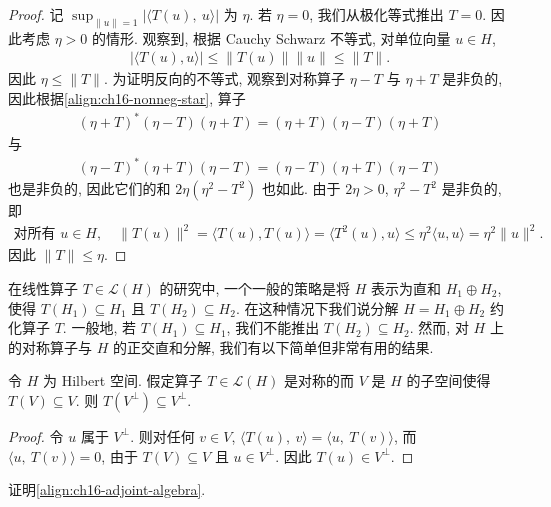 \documentclass[../../main.tex]{subfiles}
\begin{document}
\begin{proof}
记 $\sup_{\|u\|=1}|\langle T(u),\ u\rangle|$ 为 $\eta$. 若 $\eta=0$, 我们从极化等式推出 $T=0$. 因此考虑 $\eta>0$ 的情形. 观察到, 根据 Cauchy Schwarz 不等式, 对单位向量 $u\in H$,
\begin{align*}
|\langle T(u),u\rangle|\leqslant\|T(u)\|\|u\|\leqslant\|T\|.
\end{align*}
因此 $\eta\leqslant\|T\|$. 为证明反向的不等式, 观察到对称算子 $\eta-T$ 与 $\eta+T$ 是非负的, 因此根据\eqref{align:ch16-nonneg-star}, 算子
\begin{align*}
(\eta+T)^{*}(\eta-T)(\eta+T)=(\eta+T)(\eta-T)(\eta+T)
\end{align*}
与
\begin{align*}
(\eta-T)^{*}(\eta+T)(\eta-T)=(\eta-T)(\eta+T)(\eta-T)
\end{align*}
也是非负的, 因此它们的和 $2\eta(\eta^{2}-T^{2})$ 也如此. 由于 $2\eta>0$, $\eta^{2}-T^{2}$ 是非负的, 即
\begin{align*}
\text{对所有 }u\in H,\quad\|T(u)\|^{2}=\langle T(u),T(u)\rangle=\langle T^{2}(u),u\rangle\leqslant\eta^{2}\langle u,u\rangle=\eta^{2}\|u\|^{2}.
\end{align*}
因此 $\|T\|\leqslant\eta$.
\end{proof}

在线性算子 $T\in\mathcal{L}(H)$ 的研究中, 一个一般的策略是将 $H$ 表示为直和 $H_{1}\oplus H_{2}$, 使得 $T(H_{1})\subseteq H_{1}$ 且 $T(H_{2})\subseteq H_{2}$. 在这种情况下我们说分解 $H=H_{1}\oplus H_{2}$ 约化算子 $T$. 一般地, 若 $T(H_{1})\subseteq H_{1}$, 我们不能推出 $T(H_{2})\subseteq H_{2}$. 然而, 对 $H$ 上的对称算子与 $H$ 的正交直和分解, 我们有以下简单但非常有用的结果.

\begin{proposition}\label{proposition:ch16-invariant-orthocomp}
令 $H$ 为 Hilbert 空间. 假定算子 $T\in\mathcal{L}(H)$ 是对称的而 $V$ 是 $H$ 的子空间使得 $T(V)\subseteq V$. 则 $T(V^{\perp})\subseteq V^{\perp}$.
\end{proposition}

\begin{proof}
令 $u$ 属于 $V^{\perp}$. 则对任何 $v\in V$, $\langle T(u),\ v\rangle=\langle u,\ T(v)\rangle$, 而 $\langle u,\ T(v)\rangle=0$, 由于 $T(V)\subseteq V$ 且 $u\in V^{\perp}$. 因此 $T(u)\in V^{\perp}$.
\end{proof}

\begin{exercise}\label{exercise:ch16-27}
证明\eqref{align:ch16-adjoint-algebra}.
\end{exercise}
\end{document}
